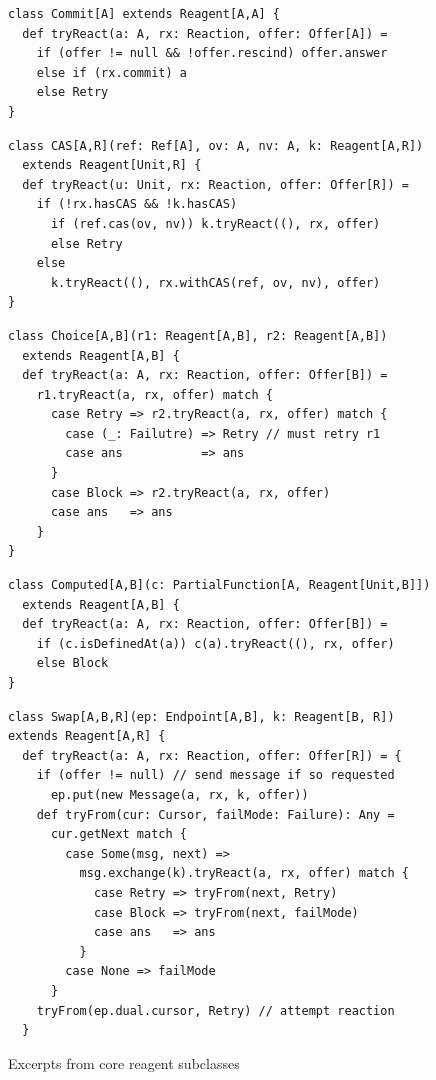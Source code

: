 \documentclass[preprint,nocopyrightspace]{sigplanconf}
\begin{document}
\begin{figure}[t]
\begin{lstlisting}[frame=single]
class Commit[A] extends Reagent[A,A] {
  def tryReact(a: A, rx: Reaction, offer: Offer[A]) = 
    if (offer != null && !offer.rescind) offer.answer
    else if (rx.commit) a 
    else Retry
}
\end{lstlisting}
\vskip -4pt
\begin{lstlisting}[frame=single]
class CAS[A,R](ref: Ref[A], ov: A, nv: A, k: Reagent[A,R]) 
  extends Reagent[Unit,R] {
  def tryReact(u: Unit, rx: Reaction, offer: Offer[R]) = 
    if (!rx.hasCAS && !k.hasCAS)
      if (ref.cas(ov, nv)) k.tryReact((), rx, offer)
      else Retry
    else
      k.tryReact((), rx.withCAS(ref, ov, nv), offer)
}
\end{lstlisting}
\vskip -4pt
\begin{lstlisting}[frame=single]
class Choice[A,B](r1: Reagent[A,B], r2: Reagent[A,B]) 
  extends Reagent[A,B] {
  def tryReact(a: A, rx: Reaction, offer: Offer[B]) = 
    r1.tryReact(a, rx, offer) match {
      case Retry => r2.tryReact(a, rx, offer) match {
        case (_: Failutre) => Retry // must retry r1
        case ans           => ans
      }
      case Block => r2.tryReact(a, rx, offer)
      case ans   => ans
    }
}
\end{lstlisting}
\vskip -4pt
\begin{lstlisting}[frame=single]
class Computed[A,B](c: PartialFunction[A, Reagent[Unit,B]]) 
  extends Reagent[A,B] {
  def tryReact(a: A, rx: Reaction, offer: Offer[B]) = 
    if (c.isDefinedAt(a)) c(a).tryReact((), rx, offer)
    else Block
}
\end{lstlisting}
\vskip -4pt
\begin{lstlisting}[frame=single]
class Swap[A,B,R](ep: Endpoint[A,B], k: Reagent[B, R]) 
extends Reagent[A,R] {
  def tryReact(a: A, rx: Reaction, offer: Offer[R]) = {
    if (offer != null) // send message if so requested
      ep.put(new Message(a, rx, k, offer))
    def tryFrom(cur: Cursor, failMode: Failure): Any = 
      cur.getNext match {
        case Some(msg, next) =>
          msg.exchange(k).tryReact(a, rx, offer) match {
            case Retry => tryFrom(next, Retry)
            case Block => tryFrom(next, failMode)
            case ans   => ans
          }
        case None => failMode
      }    
    tryFrom(ep.dual.cursor, Retry) // attempt reaction
  }
\end{lstlisting}
\nocaptionrule
\caption{Excerpts from core reagent subclasses}
\label{fig:impl}
\end{figure}
\end{document}
